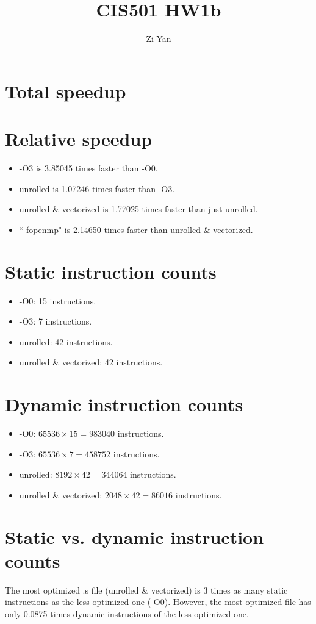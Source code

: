 \documentclass[12pt,letterpaper]{article}
\author{Zi Yan}
\title{CIS501 HW1b}
\date{}
\begin{document}
\maketitle

\section{Total speedup}

\section{Relative speedup}
\begin{itemize}
    \item -O3 is 3.85045 times faster than -O0.
    \item unrolled is 1.07246 times faster than -O3.
    \item unrolled \& vectorized is 1.77025 times faster than just unrolled.
    \item ``-fopenmp" is 2.14650 times faster than unrolled \& vectorized.
\end{itemize}
\section{Static instruction counts}
\begin{itemize}
    \item -O0: 15 instructions.
    \item -O3: 7 instructions.
    \item unrolled: 42 instructions.
    \item unrolled \& vectorized: 42 instructions.
\end{itemize}

\section{Dynamic instruction counts}
\begin{itemize}
    \item -O0: $65536 \times 15 = 983040$ instructions.
    \item -O3: $65536 \times 7 = 458752$ instructions.
    \item unrolled: $8192 \times 42 = 344064$ instructions.
    \item unrolled \& vectorized: $2048 \times 42 = 86016$ instructions.
\end{itemize}

\section{Static vs. dynamic instruction counts}
The most optimized .s file (unrolled \& vectorized) is 3 times as many
static instructions as the less optimized one (-O0). However, the most
optimized file has only 0.0875 times dynamic instructions of the less
optimized one. 
\end{document}
